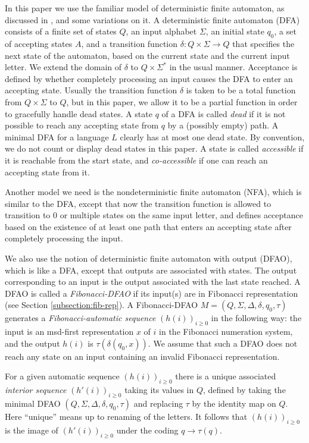\documentclass[12pt,reqno]{article}
\begin{document}
In this paper we use the familiar model of deterministic finite automaton, as discussed in \cite{hopcroft_introduction_1979}, and some variations on it.
A deterministic finite automaton (DFA)
consists of a finite set of states $Q$, an input alphabet
$\Sigma$,
an initial state $q_0$,
a set of accepting states $A$,
and a transition function $\delta:Q \times \Sigma \rightarrow Q$ that specifies the next state of the
automaton, based on the current state and the current input letter.  We extend the domain of $\delta$ to $Q \times \Sigma^*$ in the usual manner.
Acceptance is defined by whether completely processing an input causes the
DFA to enter an accepting state.
Usually the transition function $\delta$ is taken to be a total
function from $Q \times \Sigma$ to $Q$, but in this paper, we allow
it to be a partial function in order to gracefully handle dead states. 
A state $q$ of a DFA is called {\it dead} if it is not
possible to reach any accepting state from $q$ by a 
(possibly empty) path.  A minimal DFA for a language $L$
clearly has at most one dead state.  By convention, we
do not count or display dead states in this paper. A state is called {\it accessible} if it is reachable from the start state, and
{\it co-accessible} if one can reach an accepting state from it.

Another model we need is the nondeterministic finite automaton (NFA), which
is similar to the DFA, except that now the transition function
is allowed to transition to $0$ or multiple states on the same input
letter, and defines acceptance based on the existence of at least
one path that enters an accepting state after completely processing the input.

We also use the notion of deterministic finite automaton
with output (DFAO), which is like a DFA, except that outputs are associated
with states.  The output corresponding to an input is the output associated
with the last state reached.   A DFAO is called a {\it Fibonacci-DFAO\/} if its input(s) are in Fibonacci representation (see Section \ref{subsection:fib-rep}).  A Fibonacci-DFAO $M = (Q, \Sigma, \Delta, \delta, q_0, \tau)$ generates a {\it Fibonacci-automatic sequence} $(h(i))_{i \geq 0}$ in the following way: the input is an
msd-first representation $x$ of $i$ in the Fibonacci numeration system, and the output
$h(i)$ is $\tau(\delta(q_0, x))$.  We assume that such a DFAO does not reach any state on an input containing an invalid Fibonacci representation.

For a given
automatic sequence $(h(i))_{i \geq 0}$ there is a 
unique associated {\it interior sequence} $(h'(i))_{i \geq 0}$ taking
its values in $Q$, defined
by taking the minimal DFAO $(Q, \Sigma, \Delta, \delta, q_0, \tau)$ and replacing $\tau$ by the identity map on $Q$.  Here ``unique'' means up to renaming of the letters.
It follows that $(h(i))_{i \geq 0}$ is the image of
$(h'(i))_{i \geq 0}$
under the coding $q \rightarrow \tau(q)$.
\end{document}
